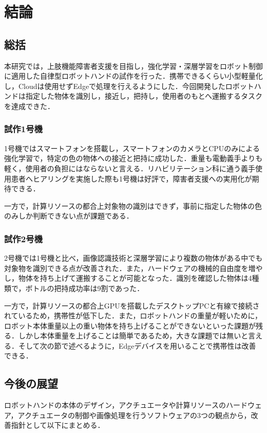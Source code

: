 \chapter{結論}
\newpage

\section{総括}
本研究では，上肢機能障害者支援を目指し，強化学習・深層学習をロボット制御に適用した自律型ロボットハンドの試作を行った．携帯できるくらい小型軽量化し，Cloudは使用せずEdgeで処理を行えるようにした．今回開発したロボットハンドは指定した物体を識別し，接近し，把持し，使用者のもとへ運搬するタスクを達成できた．

\subsection*{試作1号機}
1号機ではスマートフォンを搭載し，スマートフォンのカメラとCPUのみによる強化学習で，特定の色の物体への接近と把持に成功した．重量も電動義手よりも軽く，使用者の負担にはならないと言える．リハビリテーション科に通う義手使用患者へヒアリングを実施した際も1号機は好評で，障害者支援への実用化が期待できる．

一方で，計算リソースの都合上対象物の識別はできず，事前に指定した物体の色のみしか判断できない点が課題である．

\subsection*{試作2号機}
2号機では1号機と比べ，画像認識技術と深層学習により複数の物体がある中でも対象物を識別できる点が改善された．また，ハードウェアの機械的自由度を増やし，物体を持ち上げて運搬することが可能となった．識別を確認した物体は4種類で，ボトルの把持成功率は9割であった．

一方で，計算リソースの都合上GPUを搭載したデスクトップPCと有線で接続されているため，携帯性が低下した．また，ロボットハンドの重量が軽いために，ロボット本体重量以上の重い物体を持ち上げることができないといった課題が残る．しかし本体重量を上げることは簡単であるため，大きな課題では無いと言える．そして次の節で述べるように，Edgeデバイスを用いることで携帯性は改善できる．


\section{今後の展望}\label{sec:今後の展望}
ロボットハンドの本体のデザイン，アクチュエータや計算リソースのハードウェア，アクチュエータの制御や画像処理を行うソフトウェアの3つの観点から，改善指針として以下にまとめる．

